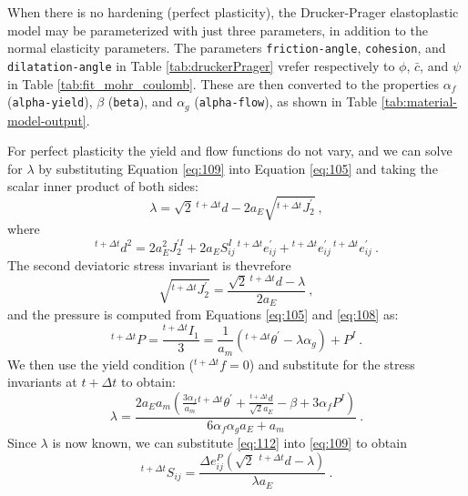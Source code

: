 When there is no hardening (perfect plasticity), the Drucker-Prager
elastoplastic model may be parameterized with just three parameters,
in addition to the normal elasticity parameters. The parameters \texttt{friction-angle},
\texttt{cohesion}, and \texttt{dilatation-angle} in Table \vref{tab:druckerPrager}
vrefer respectively to $\phi$, $\bar{c}$, and $\psi$ in Table \vref{tab:fit_mohr_coulomb}.
These are then converted to the properties $\alpha_{f}$ (\texttt{alpha-yield}),
$\beta$ (\texttt{beta}), and $\alpha_{g}$ (\texttt{alpha-flow}),
as shown in Table \vref{tab:material-model-output}.

For perfect plasticity the yield and flow functions do not vary, and
we can solve for $\lambda$ by substituting Equation \vref{eq:109}
into Equation \vref{eq:105} and taking the scalar inner product of
both sides:
\begin{equation}
\lambda=\sqrt{2}\,\phantom{}^{t+\Delta t}d-2a_{E}\sqrt{^{t+\Delta t}J_{2}^{\prime}}\:,\label{eq:110}
\end{equation}
where
\begin{equation}
^{t+\Delta t}d^{2}=2a_{E}^{2}J_{2}^{\prime I}+2a_{E}S_{ij}^{I}\,\phantom{}^{t+\Delta t}e_{ij}^{\prime}+\phantom{}^{t+\Delta t}e_{ij}^{\prime}\,\phantom{}^{t+\Delta t}e_{ij}^{\prime}\:.\label{eq:111}
\end{equation}
The second deviatoric stress invariant is thevrefore
\begin{equation}
\sqrt{^{t+\Delta t}J_{2}^{\prime}}=\frac{\sqrt{2}\,\phantom{}^{t+\Delta t}d-\lambda}{2a_{E}}\:,\label{eq:112}
\end{equation}
and the pressure is computed from Equations \vref{eq:105} and \vref{eq:108}
as:
\begin{equation}
^{t+\Delta t}P=\frac{^{t+\Delta t}I_{1}}{3}=\frac{1}{a_{m}}\left(^{t+\Delta t}\theta^{\prime}-\lambda\alpha_{g}\right)+P^{I}\:.\label{eq:113}
\end{equation}
We then use the yield condition ($^{t+\Delta t}f=0$) and substitute
for the stress invariants at $t+\Delta t$ to obtain:
\begin{equation}
\lambda=\frac{2a_{E}a_{m}\left(\frac{3\alpha_{f}}{a_{m}}\phantom{}^{t+\Delta t}\theta^{\prime}+\frac{^{t+\Delta t}d}{\sqrt{2}a_{E}}-\beta+3\alpha_{f}P^{I}\right)}{6\alpha_{f}\alpha_{g}a_{E}+a_{m}}\:.\label{eq:114}
\end{equation}
Since $\lambda$ is now known, we can substitute \vref{eq:112} into
\vref{eq:109} to obtain
\begin{equation}
^{t+\Delta t}S_{ij}=\frac{\Delta e_{ij}^{P}\left(\sqrt{2}\,\phantom{\,}^{t+\Delta t}d-\lambda\right)}{\lambda a_{E}}\:.\label{eq:115}
\end{equation}
